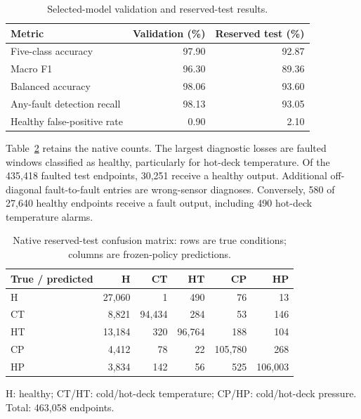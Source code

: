 \begin{table}[htbp]\centering\small
\caption{Selected-model validation and reserved-test results.}\label{tab:overall}
\begin{tabularx}{\linewidth}{X r r}
\toprule
Metric & Validation (\%) & Reserved test (\%) \\
\midrule
Five-class accuracy & 97.90 & 92.87 \\
Macro F1 & 96.30 & 89.36 \\
Balanced accuracy & 98.06 & 93.60 \\
Any-fault detection recall & 98.13 & 93.05 \\
Healthy false-positive rate & 0.90 & 2.10 \\
\bottomrule\end{tabularx}
\end{table}

Table~\ref{tab:confusion} retains the native counts. The largest diagnostic losses are faulted windows classified as healthy, particularly for hot-deck temperature. Of the 435,418 faulted test endpoints, 30,251 receive a healthy output. Additional off-diagonal fault-to-fault entries are wrong-sensor diagnoses. Conversely, 580 of 27,640 healthy endpoints receive a fault output, including 490 hot-deck temperature alarms.

\begin{table}[htbp]\centering\small
\caption{Native reserved-test confusion matrix: rows are true conditions; columns are frozen-policy predictions.}\label{tab:confusion}
\begin{tabularx}{\linewidth}{l r r r r r}
\toprule
True / predicted & H & CT & HT & CP & HP \\
\midrule
H & 27,060 & 1 & 490 & 76 & 13 \\
CT & 8,821 & 94,434 & 284 & 53 & 146 \\
HT & 13,184 & 320 & 96,764 & 188 & 104 \\
CP & 4,412 & 78 & 22 & 105,780 & 268 \\
HP & 3,834 & 142 & 56 & 525 & 106,003 \\
\bottomrule\end{tabularx}
\par\smallskip\footnotesize H: healthy; CT/HT: cold/hot-deck temperature; CP/HP: cold/hot-deck pressure. Total: 463,058 endpoints.
\end{table}


